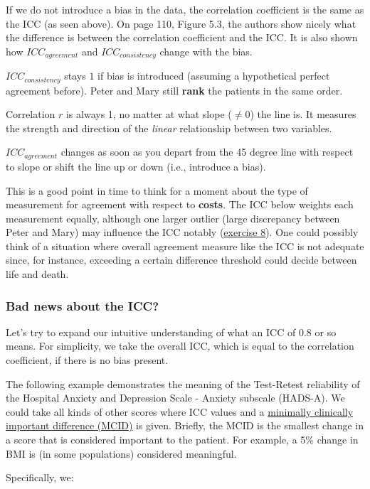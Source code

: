 \documentclass[
]{article}
\begin{document}
If we do not introduce a bias in the data, the correlation coefficient
is the same as the ICC (as seen above). On page 110, Figure 5.3, the authors show nicely
what the difference is between the correlation coefficient and the ICC.
It is also shown how \(ICC_{agreement}\) and \(ICC_{consistency}\) change with the bias.

\(ICC_{consistency}\) stays \(1\) if bias is introduced (assuming a hypothetical
perfect agreement before). Peter and Mary still \textbf{rank} the patients
in the same order.

Correlation \(r\) is always 1, no matter at what slope (\(\ne 0\)) the line is.
It measures the strength and direction of the \emph{linear} relationship between two variables.

\(ICC_{agreement}\) changes as soon as you depart from the 45 degree line
with respect to slope or
shift the line up or down (i.e., introduce a bias).

This is a good point in time to think for a moment about the type of measurement
for agreement with respect to \textbf{costs}. The ICC below weights each measurement
equally, although one larger outlier (large discrepancy between Peter and Mary)
may influence the ICC notably (\hyperref[exercise8]{exercise 8}).
One could possibly think of a situation where
overall agreement measure like the ICC is not adequate since,
for instance, exceeding a certain
difference threshold could decide between life and death.

\subsubsection{Bad news about the ICC?}\label{badnews}

Let's try to expand our intuitive understanding of what an ICC of 0.8 or so means.
For simplicity, we take the overall ICC, which is equal to the correlation coefficient,
if there is no bias present.

The following example demonstrates the meaning of the Test-Retest reliability of
the Hospital Anxiety and Depression Scale - Anxiety subscale (HADS-A). We could take
all kinds of other scores where ICC values and a
\href{https://en.wikipedia.org/wiki/Minimal_important_difference}{minimally clinically important difference (MCID)}
is given. Briefly, the MCID is the smallest change in a score that is considered
important to the patient. For example, a 5\% change in BMI is (in some populations)
considered meaningful.

Specifically, we:
\end{document}
